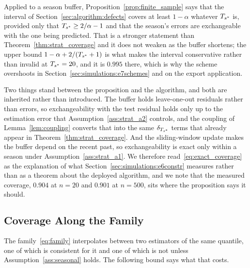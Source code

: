\begin{remark}
\label{rem:finite_caveat}
Applied to a season buffer, Proposition~\ref{prop:finite_sample} says
that the interval of Section~\ref{sec:algorithm:defects} covers at
least $1-\alpha$ whatever $T_{s^*}$ is, provided only that
$T_{s^*} \geq 2/\alpha - 1$ and that the season's errors are exchangeable
with the one being predicted.  That is a stronger statement than
Theorem~\ref{thm:strat_coverage} and it does not weaken as the buffer
shortens; the upper bound $1-\alpha + 2/(T_{s^*}+1)$ is what makes the
interval conservative rather than invalid at $T_{s^*} = 20$, and it is
$0.995$ there, which is why the scheme overshoots in
Section~\ref{sec:simulations:e7schemes} and on the export application.

Two things stand between the proposition and the algorithm, and both
are inherited rather than introduced.  The buffer holds leave-one-out
residuals rather than errors, so exchangeability with the test residual
holds only up to the estimation error that
Assumption~\ref{ass:strat_a2} controls, and the coupling of
Lemma~\ref{lem:coupling} converts that into the same
$\delta_{T_{s^*}}$ terms that already appear in
Theorem~\ref{thm:strat_coverage}.  And the sliding-window update makes
the buffer depend on the recent past, so exchangeability is exact only
within a season under Assumption~\ref{ass:strat_a1}.  We therefore
read~\eqref{eq:exact_coverage} as the explanation of what
Section~\ref{sec:simulations:e6constr} measures rather than as a
theorem about the deployed algorithm, and we note that the measured
coverage, $0.904$ at $n = 20$ and $0.901$ at $n = 500$, sits where the
proposition says it should.
\end{remark}

\subsection{Coverage Along the Family}
\label{sec:theory:family}

The family~\eqref{eq:family} interpolates between two estimators of the
same quantile, one of which is consistent for it and one of which is not
unless Assumption~\ref{ass:seasonal} holds.  The following bound says what
that costs.

